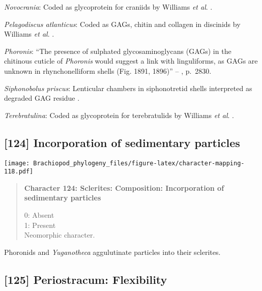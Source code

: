 \documentclass[openany]{book}
\theoremstyle{definition}
\theoremstyle{definition}
\theoremstyle{definition}
\theoremstyle{remark}
\begin{document}
\hypertarget{Novocrania-coding-123}{}
\emph{Novocrania}: Coded as glycoprotein for craniids by Williams
\emph{et al}. \citeyearpar{Williams1996Asupra}.

\hypertarget{Pelagodiscus_atlanticus-coding-123}{}
\emph{Pelagodiscus atlanticus}: Coded as GAGs, chitin and collagen in
discinids by Williams \emph{et al}. \citeyearpar{Williams1996Asupra}.

\hypertarget{Phoronis-coding-123}{}
\emph{Phoronis}: ``The presence of sulphated glycosaminoglycans (GAGs)
in the chitinous cuticle of \emph{Phoronis}
\citep[p.~215]{Herrmann1997Phoronida} would suggest a link with
linguliforms, as GAGs are unknown in rhynchonelliform shells (Fig. 1891,
1896)'' -- \citet{Williams2007Supplement}, p.~2830.

\hypertarget{Siphonobolus_priscus-coding-123}{}
\emph{Siphonobolus priscus}: Lenticular chambers in siphonotretid shells
interpreted as degraded GAG residue
\citep{Williams2004Chemicostructure}.

\hypertarget{Terebratulina-coding-123}{}
\emph{Terebratulina}: Coded as glycoprotein for terebratulids by
Williams \emph{et al}. \citeyearpar{Williams1996Asupra}.

\subsection*{{[}124{]} Incorporation of sedimentary
particles}\label{incorporation-of-sedimentary-particles}

\texttt{[image: Brachiopod\_phylogeny\_files/figure-latex/character-mapping-118.pdf]}

\begin{quote}
\textbf{Character 124: Sclerites: Composition: Incorporation of
sedimentary particles}

0: Absent\\
1: Present\\
Neomorphic character.
\end{quote}

Phoronids and \emph{Yuganotheca} aggulutinate particles into their
sclerites.

\subsection*{{[}125{]} Periostracum:
Flexibility}\label{periostracum-flexibility}
\end{document}
